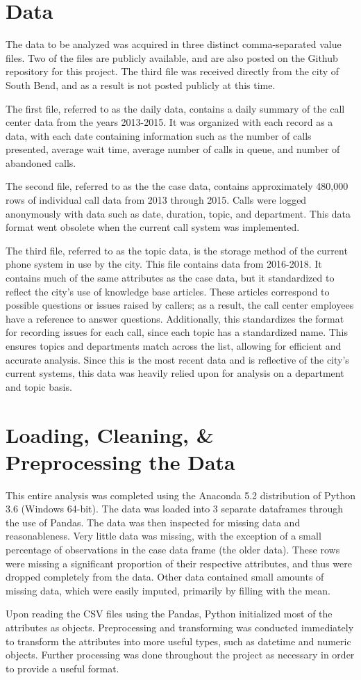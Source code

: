 \documentclass[11pt,twocolumn]{article}
\begin{document}
\section{Data}
The data to be analyzed was acquired in three distinct comma-separated value files.  Two of the files are publicly available, and are also posted on the Github repository for this project.  The third file was received directly from the city of South Bend, and as a result is not posted publicly at this time.
\par
The first file, referred to as the daily data, contains a daily summary of the call center data from the years 2013-2015.  It was organized with each record as a data, with each date containing information such as the number of calls presented, average wait time, average number of calls in queue, and number of abandoned calls.
\par
The second file, referred to as the the case data, contains approximately 480,000 rows of individual call data from 2013 through 2015.  Calls were logged anonymously with data such as date, duration, topic, and department.  This data format went obsolete when the current call system was implemented.
\par
The third file, referred to as the topic data, is the storage method of the current phone system in use by the city.  This file contains data from 2016-2018.  It contains much of the same attributes as the case data, but it standardized to reflect the city's use of knowledge base articles.  These articles correspond to possible questions or issues raised by callers; as a result, the call center employees have a reference to answer questions.  Additionally, this standardizes the format for recording issues for each call, since each topic has a standardized name.  This ensures topics and departments match across the list, allowing for efficient and accurate analysis.  Since this is the most recent data and is reflective of the city's current systems, this data was heavily relied upon for analysis on a department and topic basis.

\section{Loading, Cleaning, \& Preprocessing the Data}
This entire analysis was completed using the Anaconda 5.2 distribution of Python 3.6 (Windows 64-bit).  The data was loaded into 3 separate dataframes through the use of Pandas.  The data was then inspected for missing data and reasonableness.  Very little data was missing, with the exception of a small percentage of observations in the case data frame (the older data).  These rows were missing a significant proportion of their respective attributes, and thus were dropped completely from the data.  Other data contained small amounts of missing data, which were easily imputed, primarily by filling with the mean.
\par
Upon reading the CSV files using the Pandas, Python initialized most of the attributes as objects.  Preprocessing and transforming was conducted immediately to transform the attributes into more useful types, such as datetime and numeric objects.  Further processing was done throughout the project as necessary in order to provide a useful format.
\end{document}

